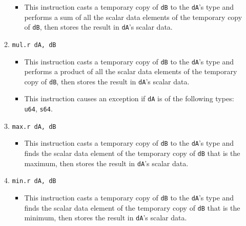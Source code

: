 \documentclass{article}
\begin{document}
\begin{itemize}
\begin{enumerate}
\begin{itemize}
				\item This instruction casts a temporary copy of
					\texttt{dB} to the \texttt{dA}'s type and performs a
					sum of all the scalar data elements of the temporary
					copy of \texttt{dB}, then stores the result in
					\texttt{dA}'s scalar data.
				\end{itemize}
			\item \texttt{mul.r dA, dB}
				\begin{itemize}
				\item This instruction casts a temporary copy of
					\texttt{dB} to the \texttt{dA}'s type and performs a
					product of all the scalar data elements of the
					temporary copy of \texttt{dB}, then stores the result
					in \texttt{dA}'s scalar data.
				\item This instruction causes an exception if \texttt{dA}
					is of the following types: \texttt{u64}, \texttt{s64}.
				\end{itemize}
			\item \texttt{max.r dA, dB}
				\begin{itemize}
				\item This instruction casts a temporary copy of
					\texttt{dB} to the \texttt{dA}'s type and finds the
					scalar data element of the temporary copy of
					\texttt{dB} that is the maximum, then stores the result
					in \texttt{dA}'s scalar data.
				\end{itemize}
			\item \texttt{min.r dA, dB}
				\begin{itemize}
				\item This instruction casts a temporary copy of
					\texttt{dB} to the \texttt{dA}'s type and finds the
					scalar data element of the temporary copy of
					\texttt{dB} that is the minimum, then stores the result
					in \texttt{dA}'s scalar data.
				\end{itemize}


\end{enumerate}
\end{itemize}
\end{document}
